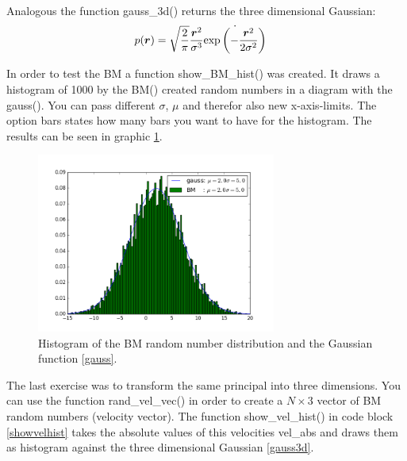 Analogous the function gauss\_3d() returns the three dimensional Gaussian:
\begin{align}
p(\boldsymbol{r}) 
&= \sqrt{\frac{2}{\pi}}\frac{\boldsymbol{r}^2}{\sigma^3}\dot{\text{exp}\left( -\frac{\boldsymbol{r}^2}{2\sigma^2} \right)}
\label{gauss3d}
\end{align}

In order to test the BM a function show\_BM\_hist() was created.
It draws a histogram of 1000 by the BM() created random numbers in a diagram with the gauss().
You can pass different $\sigma$, $\mu$ and therefor also new x-axis-limits.
The option bars states how many bars you want to have for the histogram.
The results can be seen in graphic \ref{bmhist}.


\begin{figure}[ht]
	\centering
	\includegraphics[width=0.7\textwidth]{../dat/BM_hist.png}
	\caption{
		Histogram of the BM random number distribution and the Gaussian function \eqref{gauss}.
	}
	\label{bmhist}
\end{figure}

The last exercise was to transform the same principal into three dimensions.
You can use the function rand\_vel\_vec() in order to create a $N\times 3$ vector of BM random numbers (velocity vector). 
The function show\_vel\_hist() in code block \ref{showvelhist} takes the absolute values of this velocities vel\_abs and draws them as histogram against the three dimensional Gaussian \eqref{gauss3d}.


